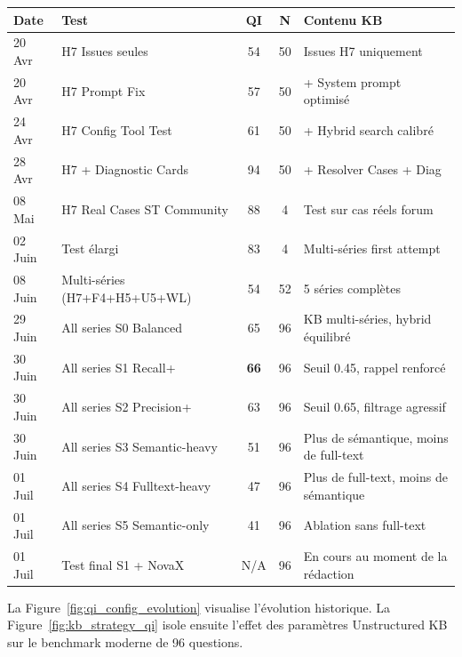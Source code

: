 \begin{longtable}{p{2.4cm}p{5.2cm}ccp{3.2cm}}
\toprule
\textbf{Date} & \textbf{Test} & \textbf{QI} & \textbf{N} & \textbf{Contenu KB} \\
\midrule
20 Avr & H7 Issues seules & 54 & 50 & Issues H7 uniquement \\
20 Avr & H7 Prompt Fix & 57 & 50 & + System prompt optimisé \\
24 Avr & H7 Config Tool Test & 61 & 50 & + Hybrid search calibré \\
28 Avr & H7 + Diagnostic Cards & 94 & 50 & + Resolver Cases + Diag \\
08 Mai & H7 Real Cases ST Community & 88 & 4 & Test sur cas réels forum \\
02 Juin & Test élargi & 83 & 4 & Multi-séries first attempt \\
08 Juin & Multi-séries (H7+F4+H5+U5+WL) & 54 & 52 & 5 séries complètes \\
29 Juin & All series S0 Balanced & 65 & 96 & KB multi-séries, hybrid équilibré \\
30 Juin & All series S1 Recall+ & \textbf{66} & 96 & Seuil 0.45, rappel renforcé \\
30 Juin & All series S2 Precision+ & 63 & 96 & Seuil 0.65, filtrage agressif \\
30 Juin & All series S3 Semantic-heavy & 51 & 96 & Plus de sémantique, moins de full-text \\
01 Juil & All series S4 Fulltext-heavy & 47 & 96 & Plus de full-text, moins de sémantique \\
01 Juil & All series S5 Semantic-only & 41 & 96 & Ablation sans full-text \\
01 Juil & Test final S1 + NovaX & N/A & 96 & En cours au moment de la rédaction \\
\bottomrule
\end{longtable}

La Figure~\ref{fig:qi_config_evolution} visualise l'évolution historique. La Figure~\ref{fig:kb_strategy_qi} isole ensuite l'effet des paramètres Unstructured KB sur le benchmark moderne de 96 questions.

